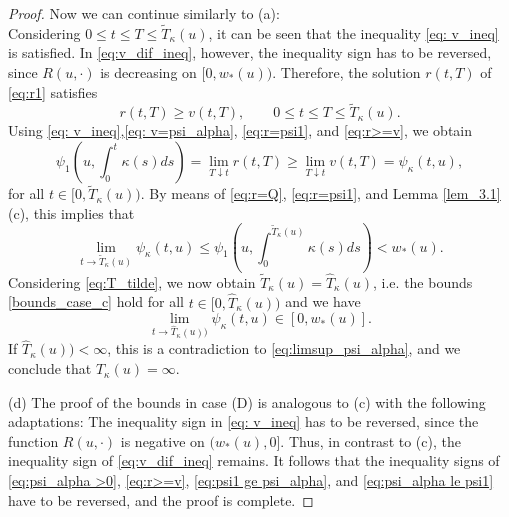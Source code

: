 \documentclass[12pt,a4paper]{amsart}
\numberwithin{equation}{section}
\numberwithin{equation}{section}
\theoremstyle{nonumberplain}
\begin{document}
\begin{proof}
Now we can continue similarly to (a): \\
Considering $0 \le t \le T \le \widetilde{T}_\kappa(u)$, it can be seen that the inequality \eqref{eq: v_ineq} is satisfied. In \eqref{eq:v_dif_ineq}, however, the inequality sign has to be reversed, since  $R(u,\cdot)$ is decreasing on $[0,w_*(u))$. Therefore, the solution $r(t,T)$ of \eqref{eq:r1} satisfies 
\begin{equation}\label{eq:r>=v}
	r(t,T) \ge v(t,T), \qquad  0 \le t \le T \le \widetilde{T}_\kappa(u).
\end{equation}
Using \eqref{eq: v_ineq},\eqref{eq: v=psi_alpha}, \eqref{eq:r=psi1}, and \eqref{eq:r>=v}, we obtain
\begin{equation}\label{eq:psi1 ge psi_alpha}
	\psi_1 \left( u,\int_0^t \kappa(s)ds \right) = \lim_{T \downarrow t} r(t,T) \ge \lim_{T \downarrow t} v(t,T) = \psi_\kappa(t,u),
\end{equation}
for all $t \in [0,\widetilde{T}_\kappa(u))$. By means of \eqref{eq:r=Q}, \eqref{eq:r=psi1}, and Lemma \ref{lem_3.1} (c), this implies that
\begin{equation}\label{eq:psi_alpha le psi1}
	\lim_{t \to \widetilde{T}_\kappa(u)} \psi_\kappa(t,u) \le \psi_1  \left( u,\int_0^{\widetilde{T}_\kappa(u)} \kappa(s)ds \right) < w_*(u).
\end{equation}
Considering \eqref{eq:T_tilde}, we now obtain $ \widetilde{T}_\kappa(u) = \hat{T}_\kappa(u)$, i.e. the bounds \eqref{bounds_case_c} hold for all $t \in [0,\hat{T}_\kappa(u))$ and we have
\[\lim_{t \to \hat{T}_\kappa(u))} \psi_\kappa(t,u)  \in [0,w_*(u)].\]
If $\hat{T}_\kappa(u)) < \infty$, this is a contradiction to \eqref{eq:limsup_psi_alpha}, and we conclude that $\hat{T}_\kappa(u) = \infty$.

(d) The proof of the bounds in case (D) is analogous to (c) with the following adaptations: The inequality sign in \eqref{eq: v_ineq} has to be reversed, since the function $R(u,\cdot)$ is negative on $(w_*(u),0]$. Thus, in contrast to (c), the inequality sign of \eqref{eq:v_dif_ineq} remains. It follows that the inequality signs of \eqref{eq:psi_alpha >0}, \eqref{eq:r>=v}, \eqref{eq:psi1 ge psi_alpha}, and \eqref{eq:psi_alpha le psi1} have to be reversed, and the proof is complete.
\end{proof}
\end{document}
